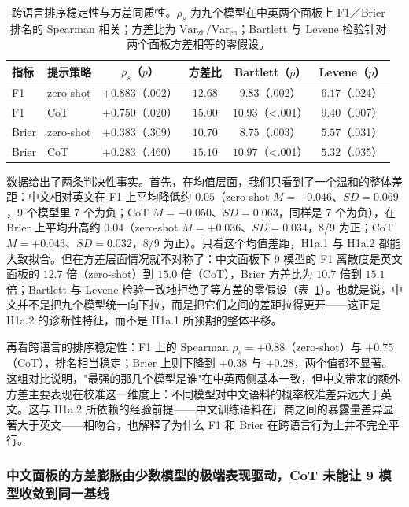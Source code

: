 \documentclass[UTF8,12pt]{ctexart}
\begin{document}
\begin{table}[htbp]
    \centering
    \caption{跨语言排序稳定性与方差同质性。$\rho_s$ 为九个模型在中英两个面板上 F1／Brier 排名的 Spearman 相关；方差比为 $\mathrm{Var}_\mathrm{zh}/\mathrm{Var}_\mathrm{en}$；Bartlett 与 Levene 检验针对两个面板方差相等的零假设。}
    \label{tab:1a-cross-lang}
    \small
    \begin{tabular}{llcccc}
        \toprule
        指标 & 提示策略 & $\rho_s$（$p$） & 方差比 & Bartlett（$p$） & Levene（$p$） \\
        \midrule
        F1    & zero-shot & $+0.883$（.002） & $12.68$ & $9.83$（.002） & $6.17$（.024） \\
        F1    & CoT       & $+0.750$（.020） & $15.00$ & $10.93$（\textless{}.001） & $9.40$（.007） \\
        Brier & zero-shot & $+0.383$（.309） & $10.70$ & $8.75$（.003） & $5.57$（.031） \\
        Brier & CoT       & $+0.283$（.460） & $15.10$ & $10.97$（\textless{}.001） & $5.32$（.035） \\
        \bottomrule
    \end{tabular}
\end{table}

数据给出了两条判决性事实。首先，在均值层面，我们只看到了一个温和的整体差距：中文相对英文在 F1 上平均降低约 $0.05$（zero-shot $M=-0.046$、$SD=0.069$，9 个模型里 7 个为负；CoT $M=-0.050$、$SD=0.063$，同样是 7 个为负），在 Brier 上平均升高约 $0.04$（zero-shot $M=+0.036$、$SD=0.034$，8/9 为正；CoT $M=+0.043$、$SD=0.032$，8/9 为正）。只看这个均值差距，H1a.1 与 H1a.2 都能大致拟合。但在方差层面情况就不对称了：中文面板下 9 模型的 F1 离散度是英文面板的 $12.7$ 倍（zero-shot）到 $15.0$ 倍（CoT），Brier 方差比为 $10.7$ 倍到 $15.1$ 倍；Bartlett 与 Levene 检验一致地拒绝了等方差的零假设（表~\ref{tab:1a-cross-lang}）。也就是说，中文并不是把九个模型统一向下拉，而是把它们之间的差距拉得更开——这正是 H1a.2 的诊断性特征，而不是 H1a.1 所预期的整体平移。

再看跨语言的排序稳定性：F1 上的 Spearman $\rho_s=+0.88$（zero-shot）与 $+0.75$（CoT），排名相当稳定；Brier 上则下降到 $+0.38$ 与 $+0.28$，两个值都不显著。这组对比说明，"最强的那几个模型是谁"在中英两侧基本一致，但中文带来的额外方差主要表现在校准这一维度上：不同模型对中文语料的概率校准差异远大于英文。这与 H1a.2 所依赖的经验前提——中文训练语料在厂商之间的暴露量差异显著大于英文——相吻合，也解释了为什么 F1 和 Brier 在跨语言行为上并不完全平行。

\subsubsection{中文面板的方差膨胀由少数模型的极端表现驱动，CoT 未能让 9 模型收敛到同一基线}
\label{subsubsec:1a-variance-driver}
\end{document}
